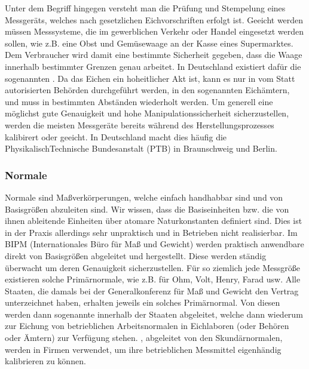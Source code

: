 \documentclass[letterpaper,10pt,english]{jupyterBook}
\begin{document}
\sphinxAtStartPar
Unter dem Begriff  hingegen versteht man die Prüfung und Stempelung eines Messgeräts, welches nach gesetzlichen Eichvorschriften erfolgt ist. Geeicht werden müssen Messsysteme, die im gewerblichen Verkehr oder Handel eingesetzt werden sollen, wie z.B. eine Obst\sphinxhyphen{} und Gemüsewaage an der Kasse eines Supermarktes. Dem Verbraucher wird damit eine bestimmte Sicherheit gegeben, dass die Waage \sphinxhyphen{} innerhalb bestimmter Grenzen \sphinxhyphen{} genau arbeitet. In Deutschland existiert dafür die sogenannten .
Da das Eichen ein hoheitlicher Akt ist, kann es nur in vom Statt autorisierten Behörden durchgeführt werden, in den sogenannten Eichämtern, und muss in bestimmten Abständen wiederholt werden. Um generell eine möglichst gute Genauigkeit und hohe Manipulationssicherheit sicherzustellen, werden die meisten Messgeräte bereits während des Herstellungsprozesses kalibirert oder geeicht. In Deutschland macht dies häufig die Physikalisch\sphinxhyphen{}Technische Bundesanstalt (PTB) in Braunschweig und Berlin.


\subsubsection{Normale}
\label{\detokenize{content/1_Messen_Einheit:normale}}
\sphinxAtStartPar


\sphinxAtStartPar
Normale sind Maßverkörperungen, welche einfach handhabbar sind und von Basisgrößen abzuleiten sind.
Wir wissen, dass die Basiseinheiten \sphinxhyphen{} bzw. die von ihnen ableitende Einheiten \sphinxhyphen{} über atomare Naturkonstanten definiert sind. Dies ist in der Praxis allerdings sehr unpraktisch und in Betrieben nicht realisierbar.
Im BIPM (Internationales Büro für Maß und Gewicht) werden praktisch anwendbare  direkt von Basisgrößen abgeleitet und hergestellt. Diese werden ständig überwacht um deren Genauigkeit sicherzustellen. Für so ziemlich jede Messgröße existieren solche Primärnormale, wie z.B. für Ohm, Volt, Henry, Farad usw.
Alle Staaten, die damals bei der Generalkonferenz für Maß und Gewicht den Vertrag unterzeichnet haben, erhalten jeweils ein solches Primärnormal. Von diesen werden dann sogenannte  innerhalb der Staaten abgeleitet, welche dann wiederum zur Eichung von betrieblichen Arbeitsnormalen in Eichlaboren (oder Behören oder Ämtern) zur Verfügung stehen.
, abgeleitet von den Skundärnormalen, werden in Firmen verwendet, um ihre betrieblichen Messmittel eigenhändig kalibrieren zu können.
\end{document}
